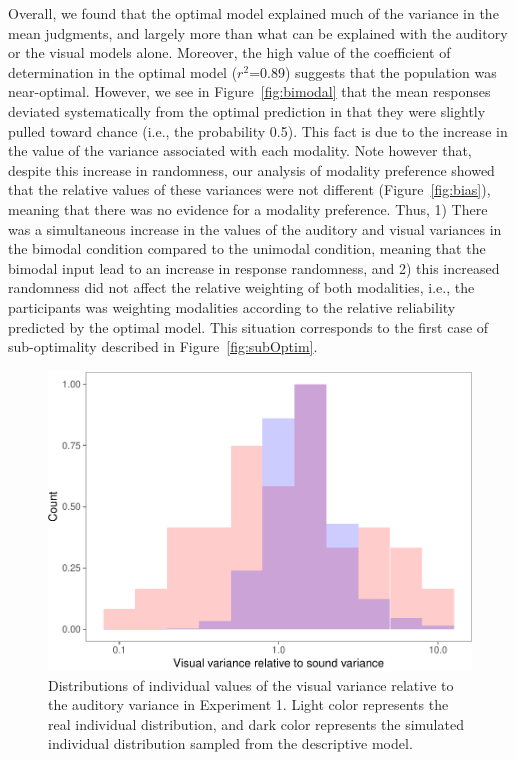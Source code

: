 \documentclass[english,,man,floatsintext]{apa6}
\theoremstyle{definition}
\theoremstyle{definition}
\theoremstyle{definition}
\theoremstyle{remark}
\begin{document}
Overall, we found that the optimal model explained much of the variance
in the mean judgments, and largely more than what can be explained with
the auditory or the visual models alone. Moreover, the high value of the
coefficient of determination in the optimal model (\(r^2\)=0.89)
suggests that the population was near-optimal. However, we see in
Figure~\ref{fig:bimodal} that the mean responses deviated systematically
from the optimal prediction in that they were slightly pulled toward
chance (i.e., the probability 0.5). This fact is due to the increase in
the value of the variance associated with each modality. Note however
that, despite this increase in randomness, our analysis of modality
preference showed that the relative values of these variances were not
different (Figure~\ref{fig:bias}), meaning that there was no evidence
for a modality preference. Thus, 1) There was a simultaneous increase in
the values of the auditory and visual variances in the bimodal condition
compared to the unimodal condition, meaning that the bimodal input lead
to an increase in response randomness, and 2) this increased randomness
did not affect the relative weighting of both modalities, i.e., the
participants was weighting modalities according to the relative
reliability predicted by the optimal model. This situation corresponds
to the first case of sub-optimality described in
Figure~\ref{fig:subOptim}.

\begin{figure}[!h]
\includegraphics[width=\textwidth]{ms_files/figure-latex/individual-1} \caption{Distributions of individual values of the visual variance relative to the auditory variance in Experiment 1. Light color represents the real individual distribution, and dark color represents the simulated individual distribution sampled from the descriptive model.}\label{fig:individual}
\end{figure}
\end{document}
